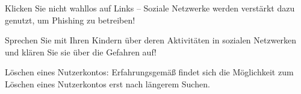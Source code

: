 \item Klicken Sie nicht wahllos auf Links -- Soziale Netzwerke werden verstärkt dazu genutzt, um Phishing zu betreiben!
\item Sprechen Sie mit Ihren Kindern über deren Aktivitäten in sozialen Netzwerken und klären Sie sie über die Gefahren auf!
\item Löschen eines Nutzerkontos: Erfahrungsgemäß findet sich die Möglichkeit zum Löschen eines Nutzerkontos erst nach längerem Suchen.